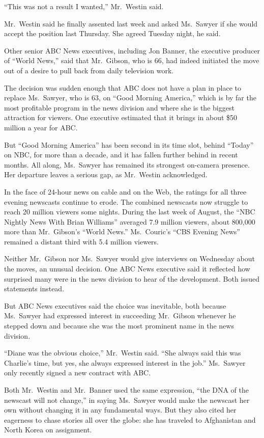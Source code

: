﻿\documentclass[12pt]{article}
\begin{document}
``This was not a result I wanted,'' Mr.~Westin said.

Mr.~Westin said he finally assented last week and asked Ms.~Sawyer if she would accept the position
last Thursday. She agreed Tuesday night, he said.

Other senior ABC News executives, including Jon Banner, the executive producer of ``World News,''
said that Mr.~Gibson, who is 66, had indeed initiated the move out of a desire to pull back from
daily television work.

The decision was sudden enough that ABC does not have a plan in place to replace Ms.~Sawyer, who is
63, on ``Good Morning America,'' which is by far the most profitable program in the news division
and where she is the biggest attraction for viewers. One executive estimated that it brings in about
\$50 million a year for ABC.

But ``Good Morning America'' has been second in its time slot, behind ``Today'' on NBC, for more
than a decade, and it has fallen further behind in recent months. All along, Ms.~Sawyer has remained
its strongest on-camera presence. Her departure leaves a serious gap, as Mr.~Westin acknowledged.

In the face of 24-hour news on cable and on the Web, the ratings for all three evening newscasts
continue to erode. The combined newscasts now struggle to reach 20 million viewers some nights.
During the last week of August, the ``NBC Nightly News With Brian Williams'' averaged 7.9 million
viewers, about 800,000 more than Mr.~Gibson's ``World News.'' Ms.~Couric's ``CBS Evening News''
remained a distant third with 5.4 million viewers.

Neither Mr.~Gibson nor Ms.~Sawyer would give interviews on Wednesday about the moves, an unusual
decision. One ABC News executive said it reflected how surprised many were in the news division to
hear of the development. Both issued statements instead.

But ABC News executives said the choice was inevitable, both because Ms.~Sawyer had expressed
interest in succeeding Mr.~Gibson whenever he stepped down and because she was the most prominent
name in the news division.

``Diane was the obvious choice,'' Mr.~Westin said. ``She always said this was Charlie's time, but
yes, she always expressed interest in the job.'' Ms.~Sawyer only recently signed a new contract with
ABC.

Both Mr.~Westin and Mr.~Banner used the same expression, ``the DNA of the newscast will not
change,'' in saying Ms.~Sawyer would make the newscast her own without changing it in any
fundamental ways. But they also cited her eagerness to chase stories all over the globe: she has
traveled to Afghanistan and North Korea on assignment.
\end{document}
